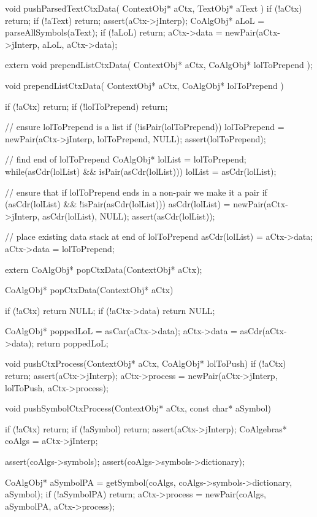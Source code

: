 \startCCode
void pushParsedTextCtxData(
  ContextObj* aCtx,
  TextObj* aText
) {
  if (!aCtx) return;
  if (!aText) return;
  assert(aCtx->jInterp);
  CoAlgObj* aLoL = parseAllSymbols(aText);
  if (!aLoL) return;
  aCtx->data = newPair(aCtx->jInterp, aLoL, aCtx->data);
}
\stopCCode

\startCHeader
extern void prependListCtxData(
  ContextObj* aCtx,
  CoAlgObj* lolToPrepend
);
\stopCHeader

\startCCode
void prependListCtxData(
  ContextObj* aCtx,
  CoAlgObj* lolToPrepend
) {
  if (!aCtx) return;
  if (!lolToPrepend) return;

  // ensure lolToPrepend is a list
  if (!isPair(lolToPrepend)) {
    lolToPrepend = newPair(aCtx->jInterp, lolToPrepend, NULL);
    assert(lolToPrepend);
  }

  // find end of lolToPrepend
  CoAlgObj* lolList = lolToPrepend;
  while(asCdr(lolList) && isPair(asCdr(lolList))) {
    lolList = asCdr(lolList);
  }

  // ensure that if lolToPrepend ends in a non-pair we make it a pair
  if (asCdr(lolList) && !isPair(asCdr(lolList))) {
    asCdr(lolList) = newPair(aCtx->jInterp, asCdr(lolList), NULL);
    assert(asCdr(lolList));
  }

  // place existing data stack at end of lolToPrepend
  asCdr(lolList) = aCtx->data;
  aCtx->data     = lolToPrepend;
}
\stopCCode

\startCHeader
extern CoAlgObj* popCtxData(ContextObj* aCtx);
\stopCHeader

\startCCode
CoAlgObj* popCtxData(ContextObj* aCtx) {
  if (!aCtx) return NULL;
  if (!aCtx->data) return NULL;

  CoAlgObj* poppedLoL = asCar(aCtx->data);
  aCtx->data          = asCdr(aCtx->data);
  return poppedLoL;
}
\stopCCode

\starttyping
void pushCtxProcess(ContextObj* aCtx, CoAlgObj* lolToPush) {
  if (!aCtx) return;
  assert(aCtx->jInterp);
  aCtx->process = newPair(aCtx->jInterp, lolToPush, aCtx->process);
}

void pushSymbolCtxProcess(ContextObj* aCtx, const char* aSymbol) {
  if (!aCtx) return;
  if (!aSymbol) return;
  assert(aCtx->jInterp);
  CoAlgebras* coAlgs = aCtx->jInterp;

  assert(coAlgs->symbols);
  assert(coAlgs->symbols->dictionary);

  CoAlgObj* aSymbolPA =
    getSymbol(coAlgs, coAlgs->symbols->dictionary, aSymbol);
  if (!aSymbolPA) return;
  aCtx->process = newPair(coAlgs, aSymbolPA, aCtx->process);
}

